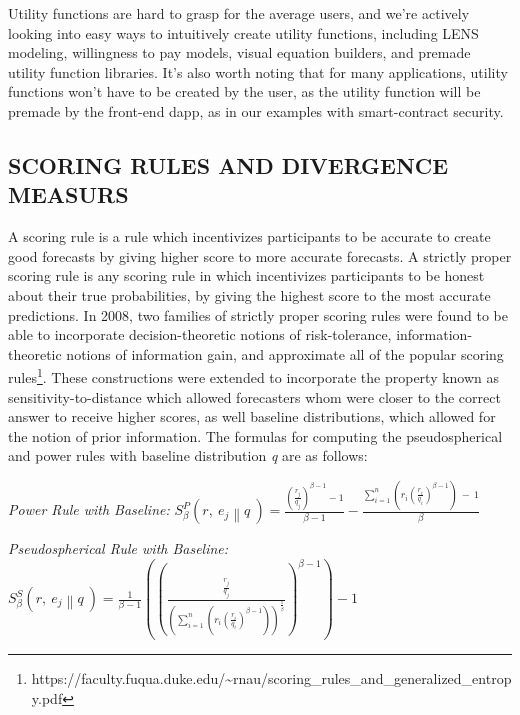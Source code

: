 Utility functions are hard to grasp for the average users, and we're
actively looking into easy ways to intuitively create utility functions,
including LENS modeling, willingness to pay models, visual equation
builders, and premade utility function libraries. It's also worth noting
that for many applications, utility functions won't have to be created
by the user, as the utility function will be premade by the front-end
dapp, as in our examples with smart-contract security.

\subsection{\texorpdfstring{\protect\hypertarget{_hni0we3evk4r}{}{\protect\hypertarget{_Toc462050442}{}{}}SCORING
RULES AND DIVERGENCE
MEASURS}{SCORING RULES AND DIVERGENCE MEASURS}}\label{scoring-rules-and-divergence-measurs}

A scoring rule is a rule which incentivizes participants to be accurate
to create good forecasts by giving higher score to more accurate
forecasts. A strictly proper scoring rule is any scoring rule in which
incentivizes participants to be honest about their true probabilities,
by giving the highest score to the most accurate predictions. In 2008,
two families of strictly proper scoring rules were found to be able to
incorporate decision-theoretic notions of risk-tolerance,
information-theoretic notions of information gain, and approximate all
of the popular scoring rules\footnote{https://faculty.fuqua.duke.edu/\textasciitilde{}rnau/scoring\_rules\_and\_generalized\_entropy.pdf}.
These constructions were extended to incorporate the property known as
sensitivity-to-distance which allowed forecasters whom were closer to
the correct answer to receive higher scores, as well baseline
distributions, which allowed for the notion of prior information. The
formulas for computing the pseudospherical and power rules with baseline
distribution \emph{q} are as follows:

\emph{Power Rule with Baseline:}
\(S_{\beta}^{P}\left( r,\ e_{j}\left\| q \right.\  \right) = \frac{\left( \frac{r_{j}}{q_{j}} \right)^{\beta - 1} - 1}{\beta - 1} - \frac{\sum_{i = 1}^{n}{({r_{i}\left( \frac{r_{i}}{q_{i}} \right)}^{\beta - 1})}\  - \ 1}{\beta}\)

\emph{Pseudospherical Rule with Baseline:}
\(S_{\beta}^{S}\left( r,\ e_{j}\left\| q \right.\  \right) = \frac{1}{\beta - 1}(\left( \frac{\frac{r_{j}}{q_{j}}}{\left( \sum_{i = 1}^{n}\left( {r_{i}\left( \frac{r_{i}}{q_{i}} \right)}^{\beta - 1} \right) \right)^{\frac{1}{\beta}}} \right)^{\beta - 1}) - 1\)

